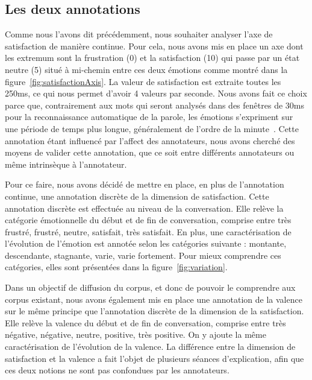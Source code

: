 \subsection{Les deux annotations}
Comme nous l'avons dit précédemment, nous souhaiter analyser l'axe de satisfaction de manière continue. Pour cela, nous avons mis en place un axe dont les extremum sont la frustration (0) et la satisfaction (10) qui passe par un état neutre (5) situé à mi-chemin entre ces deux émotions comme montré dans la figure~\ref{fig:satisfactionAxis}. La valeur de satisfaction est extraite toutes les 250ms, ce qui nous permet d'avoir 4 valeurs par seconde. Nous avons fait ce choix parce que, contrairement aux mots qui seront analysés dans des fenêtres de 30ms pour la reconnaissance automatique de la parole, les émotions s'expriment sur une période de temps plus longue, généralement de l'ordre de la minute~\cite{Schuller2010}. Cette annotation étant influencé par l'affect des annotateurs, nous avons cherché des moyens de valider cette annotation, que ce soit entre différents annotateurs ou même intrinsèque à l'annotateur.

Pour ce faire, nous avons décidé de mettre en place, en plus de l'annotation continue, une annotation discrète de la dimension de satisfaction. Cette annotation discrète est effectuée au niveau de la conversation. Elle relève la catégorie émotionnelle du début et de fin de conversation, comprise entre très frustré, frustré, neutre, satisfait, très satisfait. En plus, une caractérisation de l'évolution de l'émotion est annotée selon les catégories suivante : montante, descendante, stagnante, varie, varie fortement. Pour mieux comprendre ces catégories, elles sont présentées dans la figure~\ref{fig:variation}.

Dans un objectif de diffusion du corpus, et donc de pouvoir le comprendre aux corpus existant, nous avons également mis en place une annotation de la valence sur le même principe que l'annotation discrète de la dimension de la satisfaction. Elle relève la valence du début et de fin de conversation, comprise entre très négative, négative, neutre, positive, très positive. On y ajoute la même caractérisation de l'évolution de la valence.
La différence entre la dimension de satisfaction et la valence a fait l'objet de plusieurs séances d'explication, afin que ces deux notions ne sont pas confondues par les annotateurs.

